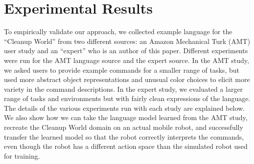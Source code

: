 \documentclass[conference]{IEEEtran}
\begin{document}





\section{Experimental Results}
To empirically validate our approach, we collected example language for the ``Cleanup World'' from two different sources: an Amazon Mechanical Turk (AMT) user study and an ``expert'' who is an author of this paper. Different experiments were run for the AMT language source and the expert source. In the AMT study, we asked users to provide example commands for a smaller range of tasks, but used more abstract object representations and unusual color choices to elicit more variety in the command descriptions. In the expert study, we evaluated a larger range of tasks and environments but with fairly clean expressions of the language. The details of the various experiments run with each study are explained below. We also show how we can take the language model learned from the AMT study, recreate the Cleanup World domain on an actual mobile robot, and successfully transfer the learned model so that the robot correctly interprets the commands, even though the robot has a different action space than the simulated robot used for training.
\end{document}
